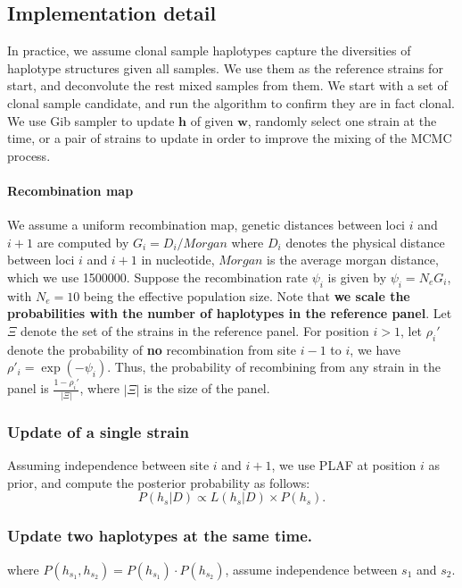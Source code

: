 \documentclass{bioinfo}
\begin{document}
\subsection{Implementation detail}
In practice, we assume clonal sample haplotypes capture the diversities of haplotype structures given all samples. We use them as the reference strains for start, and deconvolute the rest mixed samples from them. We start with a set of clonal sample candidate, and run the algorithm to confirm they are in fact clonal. We use Gib sampler to update $\mathbf h$ of given $\mathbf w$, randomly select one strain at the time, or a pair of strains to update in order to improve the mixing of the MCMC process.


\paragraph{Recombination map}
We assume a uniform recombination map, genetic distances between loci $i$ and $i+1$ are computed by $G_i = D_i / Morgan$ where $D_i$ denotes the physical distance between loci $i$ and $i+1$ in nucleotide, $Morgan$ is the average morgan distance, which we use 1500000. Suppose the recombination rate $\psi_i$ is given by $\psi_i = N_e G_i$, with $N_e=10$ being the effective population size. Note that {\bf we scale the probabilities with the number of haplotypes in the reference panel}. Let $\Xi$ denote the set of the strains in the reference panel. For position $i > 1$, let $\rho_i'$ denote the probability of {\bf no} recombination from site $i-1$ to $i$, we have $\rho'_i = \exp(-\psi_i)$. Thus, the probability of recombining from any strain in the panel is $\displaystyle\frac{1-\rho_i'}{|\Xi|}$, where $|\Xi|$ is the size of the panel.


\subsubsection{Update of a single strain}


Assuming independence between site $i$ and $i+1$, we use PLAF at position $i$ as prior, and compute the posterior probability as follows:
\begin{equation}
P(h_s | D) \propto L(h_s|D) \times P(h_s).\label{eqn:post:LDfree}
\end{equation}

\subsubsection{Update two haplotypes at the same time.}
where $P(h_{s_1},h_{s_2}) = P(h_{s_1}) \cdot P(h_{s_2})$, assume independence between $s_1$ and $s_2$.
\end{document}
